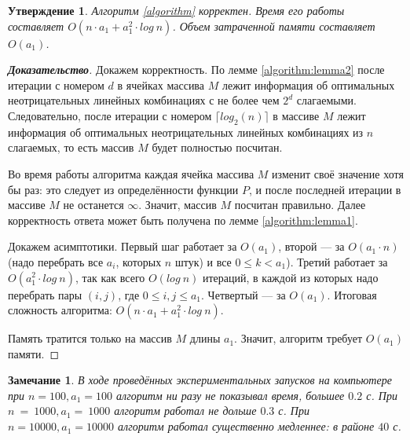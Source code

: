 \documentclass[12pt]{article}
\newtheorem{proposition}[theorem]{Утверждение}
\newtheorem{remark}[theorem]{Замечание}
\theoremstyle{definition}
\begin{document}
\begin{proposition}
Алгоритм \ref{algorithm} корректен. Время его работы составляет $O(n \cdot a_1 + a_1^2 \cdot log \ n)$. Объем затраченной памяти составляет $O(a_1)$.
\end{proposition}
\begin{proof}[\textbf{Доказательство}]
Докажем корректность. По лемме \ref{algorithm:lemma2} после итерации с номером $d$ в ячейках массива $M$ лежит информация об оптимальных неотрицательных линейных комбинациях с не более чем $2^d$ слагаемыми. Следовательно, после итерации с номером $\lceil log_2(n) \rceil$ в массиве $M$ лежит информация об оптимальных неотрицательных линейных комбинациях из $n$ слагаемых, то есть массив $M$ будет полностью посчитан.

Во время работы алгоритма каждая ячейка массива $M$ изменит своё значение хотя бы раз: это следует из определённости функции $P$, и после последней итерации в массиве $M$ не останется $\infty$. Значит, массив $M$ посчитан правильно. Далее корректность ответа может быть получена по лемме \ref{algorithm:lemma1}.

Докажем асимптотики. Первый шаг работает за $O(a_1)$, второй --- за $O(a_1 \cdot n)$ (надо перебрать все $a_i$, которых $n$ штук) и все $0 \le k < a_1$). Третий работает за $O(a_1^2 \cdot log \ n)$, так как всего $O(log \ n)$ итераций, в каждой из которых надо перебрать пары $(i, j)$, где $0 \le i, j \le a_1$. Четвертый --- за $O(a_1)$. Итоговая сложность алгоритма: $O(n \cdot a_1 + a_1^2 \cdot log \ n)$.

Память тратится только на массив $M$ длины $a_1$. Значит, алгоритм требует $O(a_1)$ памяти.
\end{proof}

\begin{remark}
В ходе проведённых экспериментальных запусков на компьютере при $n = 100, a_1 = 100$ алгоритм ни разу не показывал время, большее $0.2$ с. При $n~=~1000, a_1 =~1000$ алгоритм работал не дольше $0.3$ с. При $n = 10000, a_1 = 10000$ алгоритм работал существенно медленнее: в районе $40$ с.
\end{remark}
\end{document}
